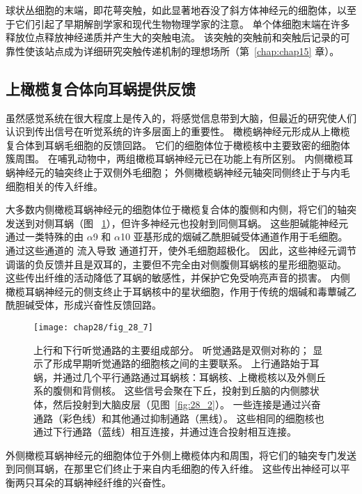 球状丛细胞的末端，即花萼突触，如此显著地吞没了斜方体神经元的细胞体，以至于它们引起了早期解剖学家和现代生物物理学家的注意。
单个体细胞末端在许多释放位点释放神经递质并产生大的突触电流。
该突触的突触前和突触后记录的可靠性使该站点成为详细研究突触传递机制的理想场所（第~\ref{chap:chap15} 章）。



\subsection{上橄榄复合体向耳蜗提供反馈}

虽然感觉系统在很大程度上是传入的，将感觉信息带到大脑，但最近的研究使人们认识到传出信号在听觉系统的许多层面上的重要性。
橄榄蜗神经元形成从上橄榄复合体到耳蜗毛细胞的反馈回路。
它们的细胞体位于橄榄核中主要致密的细胞体簇周围。
在哺乳动物中，两组橄榄耳蜗神经元已在功能上有所区别。
内侧橄榄耳蜗神经元的轴突终止于双侧外毛细胞；
外侧橄榄蜗神经元轴突同侧终止于与内毛细胞相关的传入纤维。


大多数内侧橄榄耳蜗神经元的细胞体位于橄榄复合体的腹侧和内侧，将它们的轴突发送到对侧耳蜗（图 ~\ref{fig:28_7}），但许多神经元也投射到同侧耳蜗。
这些胆碱能神经元通过一类特殊的由 $\alpha$9 和 $\alpha$10 亚基形成的烟碱乙酰胆碱受体通道作用于毛细胞。
通过这些通道的  流入导致  通道打开，使外毛细胞超极化。
因此，这些神经元调节调谐的负反馈并且是双耳的，主要但不完全由对侧腹侧耳蜗核的星形细胞驱动。
这些传出纤维的活动降低了耳蜗的敏感性，并保护它免受响亮声音的损害。
内侧橄榄耳蜗神经元的侧支终止于耳蜗核中的星状细胞，作用于传统的烟碱和毒蕈碱乙酰胆碱受体，形成兴奋性反馈回路。


\begin{figure}[htbp]
	\centering
	\texttt{[image: chap28/fig\_28\_7]}
	\caption{上行和下行听觉通路的主要组成部分。
		听觉通路是双侧对称的；
		显示了形成早期听觉通路的细胞核之间的主要联系。
		上行通路始于耳蜗，并通过几个平行通路通过耳蜗核：耳蜗核、上橄榄核以及外侧丘系的腹侧和背侧核。
		这些信号会聚在下丘，投射到丘脑的内侧膝状体，然后投射到大脑皮层（见图~\ref{fig:28_2}）。
		一些连接是通过兴奋通路（彩色线）和其他通过抑制通路（黑线）。 
		这些相同的细胞核也通过下行通路（蓝线）相互连接，并通过连合投射相互连接。}
	\label{fig:28_7}
\end{figure}


外侧橄榄耳蜗神经元的细胞体位于外侧上橄榄体内和周围，将它们的轴突专门发送到同侧耳蜗，在那里它们终止于来自内毛细胞的传入纤维。
这些传出神经可以平衡两只耳朵的耳蜗神经纤维的兴奋性\cite{darrow2006cochlear}。



